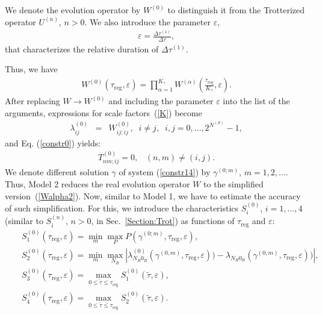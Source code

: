 \documentclass[pra,preprint,showpacs]{revtex4-1}
\begin{document}
{{We denote the evolution operator by $W^{(0)}$ to distinguish it from the Trotterized operator $U^{(n)}$, $n>0$.
We also introduce the parameter $\varepsilon$,
\begin{eqnarray}\label{var0}
\varepsilon=\frac{\Delta\tau^{(1)}}{\Delta\tau},
\end{eqnarray}
that characterizes the relative duration of $\Delta \tau^{(1)}$.

Thus, we have
\begin{eqnarray}\label{Vj2}
W^{(0)}(\tau_{\mathrm{reg}},\varepsilon) = \prod_{\alpha=1}^{K_\gamma} W^{(\alpha)}\left(\frac{\tau_{\mathrm{reg}}}{K_\gamma}
,\varepsilon\right) .
\end{eqnarray}
After replacing $W\to W^{(0)}$ and including the parameter $\varepsilon$ into the list of the arguments, expressions for scale factors~(\ref{K})  become
\begin{eqnarray}\label{K0}
\lambda^{(0)}_{ij} &=&W^{(0)}_{ij;ij},\;\; i\neq j,\;\; i,j=0,\dots,2^{N^{(S)}}-1,
\end{eqnarray}
and Eq. (\ref{constr0}) yields:
\begin{eqnarray}\label{constr14}
T^{(0)}_{nm;ij}=0, \;\;\;(n,m)\neq (i,j).
\end{eqnarray}
We denote different solution $\gamma$ of system (\ref{constr14}) by $\gamma^{(0;m)}$, $m=1,2,\dots$.
Thus, Model 2 reduces the real evolution operator  $W$  to the simplified version~(\ref{Walpha2}). Now, similar to Model 1, we have to estimate the accuracy of such simplification.
For this, we introduce the characteristics $S^{(0)}_i$, $i=1,\dots,4$ (similar to  $S^{(n)}_i$, $n>0$, in Sec.~\ref{Section:Trot}) as functions of $\tau_{\mathrm{reg}}$ and $\varepsilon$:
\begin{eqnarray}\label{2epsilon}
&&S^{(0)}_1(\tau_{\mathrm{reg}},\varepsilon) =\min_m \max_P P(\gamma^{(0;m)},\tau_{\mathrm{reg}},\varepsilon),
\\\label{2epsilon2}&&S^{(0)}_2(\tau_{\mathrm{reg}},\varepsilon) =\min_m\max_{N_R} \left|\lambda^{(0)}_{N_R0_R}(\gamma^{(0,m)},\tau_{\mathrm{reg}},\varepsilon)) -
\lambda_{N_R0_R}(\gamma^{(0,m)},\tau_{\mathrm{reg}},\varepsilon))\right|,\\\label{2S3}
&&
S^{(0)}_3(\tau_{\mathrm{reg}},\varepsilon) = \max_{0\le\tilde \tau\le \tau_{\mathrm{reg}}} S^{(0)}_1(\tilde \tau,\varepsilon),
\\\label{2S4}
&&
S^{(0)}_4(\tau_{\mathrm{reg}},\varepsilon) = \max_{0\le\tilde \tau\le \tau_{\mathrm{reg}}} S^{(0)}_2(\tilde \tau,\varepsilon).
\end{eqnarray}
}}
\end{document}
